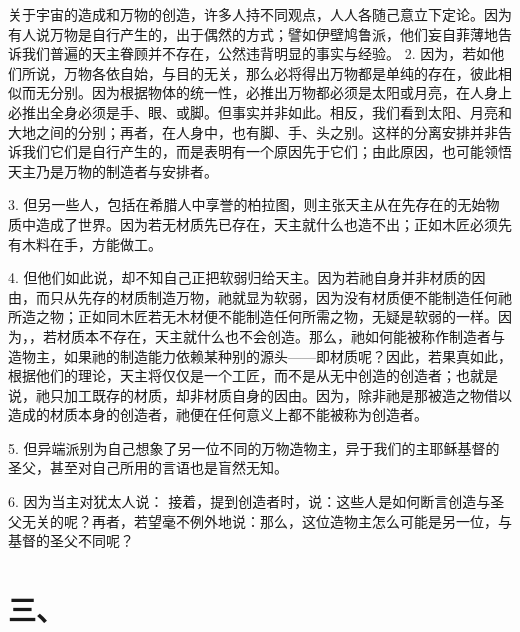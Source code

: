 关于宇宙的造成和万物的创造，许多人持不同观点，人人各随己意立下定论。因为有人说万物是自行产生的，出于偶然的方式；譬如伊壁鸠鲁派，他们妄自菲薄地告诉我们普遍的天主眷顾并不存在，公然违背明显的事实与经验。 2. 因为，若如他们所说，万物各依自始，与目的无关，那么必将得出万物都是单纯的存在，彼此相似而无分别。因为根据物体的统一性，必推出万物都必须是太阳或月亮，在人身上必推出全身必须是手、眼、或脚。但事实并非如此。相反，我们看到太阳、月亮和大地之间的分别；再者，在人身中，也有脚、手、头之别。这样的分离安排并非告诉我们它们是自行产生的，而是表明有一个原因先于它们；由此原因，也可能领悟天主乃是万物的制造者与安排者。\par

3. 但另一些人，包括在希腊人中享誉的柏拉图，则主张天主从在先存在的无始物质中造成了世界。因为若无材质先已存在，天主就什么也造不出；正如木匠必须先有木料在手，方能做工。\par

4. 但他们如此说，却不知自己正把软弱归给天主。因为若祂自身并非材质的因由，而只从先存的材质制造万物，祂就显为软弱，因为没有材质便不能制造任何祂所造之物；正如同木匠若无木材便不能制造任何所需之物，无疑是软弱的一样。因为，，若材质本不存在，天主就什么也不会创造。那么，祂如何能被称作制造者与造物主，如果祂的制造能力依赖某种别的源头——即材质呢？因此，若果真如此，根据他们的理论，天主将仅仅是一个工匠，而不是从无中创造的创造者；也就是说，祂只加工既存的材质，却非材质自身的因由。因为，除非祂是那被造之物借以造成的材质本身的创造者，祂便在任何意义上都不能被称为创造者。\par

5. 但异端派别为自己想象了另一位不同的万物造物主，异于我们的主耶稣基督的圣父，甚至对自己所用的言语也是盲然无知。\par

6. 因为当主对犹太人说： 接着，提到创造者时，说：这些人是如何断言创造与圣父无关的呢？再者，若望毫不例外地说：那么，这位造物主怎么可能是另一位，与基督的圣父不同呢？\par


\section{三、}

